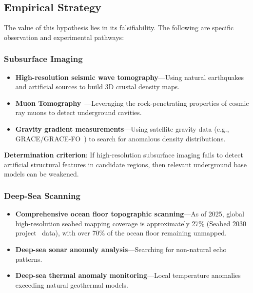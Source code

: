 \documentclass[aps,prd,twocolumn,superscriptaddress,nofootinbib]{revtex4-2}
\begin{document}
\subsection{Empirical Strategy}\label{sec:empirical}

The value of this hypothesis lies in its falsifiability. The following are specific observation and experimental pathways:

\subsubsection{Subsurface Imaging}\label{sec:subsurface-imaging}

\begin{itemize}
  \item \textbf{High-resolution seismic wave tomography}---Using natural earthquakes and artificial sources to build 3D crustal density maps.
  \item \textbf{Muon Tomography}~\cite{Alvarez1970}---Leveraging the rock-penetrating properties of cosmic ray muons to detect underground cavities.
  \item \textbf{Gravity gradient measurements}---Using satellite gravity data (e.g., GRACE/GRACE-FO~\cite{NASA_GRACEFO}) to search for anomalous density distributions.
\end{itemize}

\textbf{Determination criterion}: If high-resolution subsurface imaging fails to detect artificial structural features in candidate regions, then relevant underground base models can be weakened.

\subsubsection{Deep-Sea Scanning}\label{sec:deep-sea}

\begin{itemize}
  \item \textbf{Comprehensive ocean floor topographic scanning}---As of 2025, global high-resolution seabed mapping coverage is approximately 27\% (Seabed 2030 project~\cite{Seabed2030} data), with over 70\% of the ocean floor remaining unmapped.
  \item \textbf{Deep-sea sonar anomaly analysis}---Searching for non-natural echo patterns.
  \item \textbf{Deep-sea thermal anomaly monitoring}---Local temperature anomalies exceeding natural geothermal models.
\end{itemize}
\end{document}
